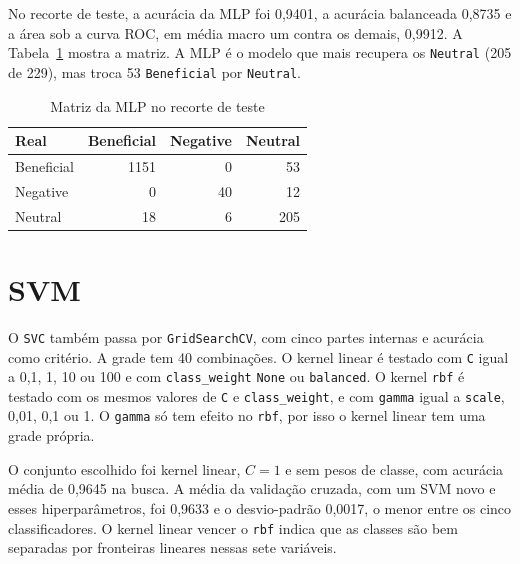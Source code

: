 \documentclass[
  article,
  12pt,
  oneside,
  a4paper,
  english,
  brazil,
  chapter=TITLE,
  section=TITLE,
  subsection=TITLE
]{abntex2}
\begin{document}
No recorte de teste, a acurácia da MLP foi 0,9401, a acurácia balanceada 0,8735 e a área sob a curva ROC, em média macro um contra os demais, 0,9912. A Tabela~\ref{tab:mlp} mostra a matriz. A MLP é o modelo que mais recupera os \texttt{Neutral} (205 de 229), mas troca 53 \texttt{Beneficial} por \texttt{Neutral}.

\begin{table}[htb]
  \centering
  \caption{Matriz da MLP no recorte de teste}
  \label{tab:mlp}
  \begin{tabular}{lrrr}
    \toprule
    Real & Beneficial & Negative & Neutral \\
    \midrule
    Beneficial & 1151 & 0 & 53 \\
    Negative & 0 & 40 & 12 \\
    Neutral & 18 & 6 & 205 \\
    \bottomrule
  \end{tabular}
\end{table}

\section{SVM}

O \texttt{SVC} também passa por \texttt{GridSearchCV}, com cinco partes internas e acurácia como critério. A grade tem 40 combinações. O kernel linear é testado com \texttt{C} igual a 0,1, 1, 10 ou 100 e com \texttt{class\_weight} \texttt{None} ou \texttt{balanced}. O kernel \texttt{rbf} é testado com os mesmos valores de \texttt{C} e \texttt{class\_weight}, e com \texttt{gamma} igual a \texttt{scale}, 0,01, 0,1 ou 1. O \texttt{gamma} só tem efeito no \texttt{rbf}, por isso o kernel linear tem uma grade própria.

O conjunto escolhido foi kernel linear, $C = 1$ e sem pesos de classe, com acurácia média de 0,9645 na busca. A média da validação cruzada, com um SVM novo e esses hiperparâmetros, foi 0,9633 e o desvio-padrão 0,0017, o menor entre os cinco classificadores. O kernel linear vencer o \texttt{rbf} indica que as classes são bem separadas por fronteiras lineares nessas sete variáveis.
\end{document}
